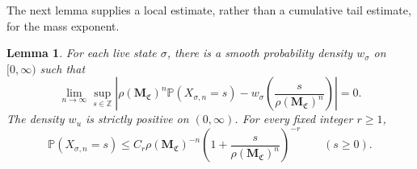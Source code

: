 \documentclass[scheme=plain,11pt]{ctexart}
\newtheorem{lemma}[theorem]{Lemma}
\theoremstyle{definition}
\theoremstyle{remark}
\begin{document}
The next lemma supplies a local estimate, rather than a cumulative tail estimate, for the mass exponent.

\begin{lemma}\label{lem:conditional-mass-local-limit}
For each live state $\sigma$, there is a smooth probability density $w_\sigma$ on $[0,\infty)$ such that
\begin{equation}\label{eq:conditional-mass-llt}
 \lim_{n\to\infty}\sup_{s\in\mathbb Z}
 \left|\rho(\mathbf M_{\mathfrak C})^n
 \mathbb P(X_{\sigma,n}=s)
 -w_\sigma\!\left(\frac{s}{\rho(\mathbf M_{\mathfrak C})^n}\right)\right|=0.
\end{equation}
The density $w_u$ is strictly positive on $(0,\infty)$.
For every fixed integer $r\ge1$,
\begin{equation}\label{eq:conditional-mass-point-bound}
 \mathbb P(X_{\sigma,n}=s)\le
 C_r\rho(\mathbf M_{\mathfrak C})^{-n}
 \left(1+\frac{s}{\rho(\mathbf M_{\mathfrak C})^n}\right)^{-r}
 \qquad(s\ge0).
\end{equation}
\end{lemma}
\end{document}
